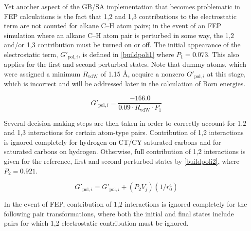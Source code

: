 \documentclass[12pt]{report}
\begin{document}
Yet another aspect of the GB/SA implementation that becomes problematic in FEP calculations is the fact that 1,2 and 1,3 contributions to the electrostatic term are not counted for alkane C--H atom pairs; in the event of an FEP simulation where an alkane C--H atom pair is perturbed in some way, the 1,2 and/or 1,3 contribution must be turned on or off. The initial appearance of the electrostatic term, $G'_{ \textrm{pol},i}$, is defined in \cref{buildpoli1} where $P_{1} = 0.073$. This also applies for the first and second perturbed states. Note that dummy atoms, which were assigned a minimum $R_{ \textrm{vdW}}$ of 1.15 \AA, acquire a nonzero  $G'_{ \textrm{pol},i}$ at this stage, which is incorrect and will be addressed later in the calculation of Born energies.

\vspace*{-0.4cm}
\begin{equation}
\label{buildpoli1}
G'_{ \textrm{pol},i} = \frac{-166.0}{0.09\cdot R_{ \textrm{vdW}}\cdot P_{1}}
\end{equation}
\vspace*{-0.5cm}


Several decision-making steps are then taken in order to correctly account for 1,2 and 1,3 interactions for certain atom-type pairs. Contribution of 1,2 interactions is ignored completely for hydrogen on CT/CY saturated carbons and for saturated carbons on hydrogen. Otherwise, full contribution of 1,2 interactions is given for the reference, first and second perturbed states by \cref{buildpoli2}, where $P_{2} = 0.921$.

\begin{equation}
\label{buildpoli2}
G'_{ \textrm{pol},i} = G'_{ \textrm{pol},i} + (P_{2}V_{j})(1/r^{4}_{0})
\end{equation}
\vspace*{-0.4cm}

In the event of FEP, contribution of 1,2 interactions is ignored completely for the following pair transformations, where both the initial and final states include pairs for which 1,2 electrostatic contribution must be ignored.
\end{document}
